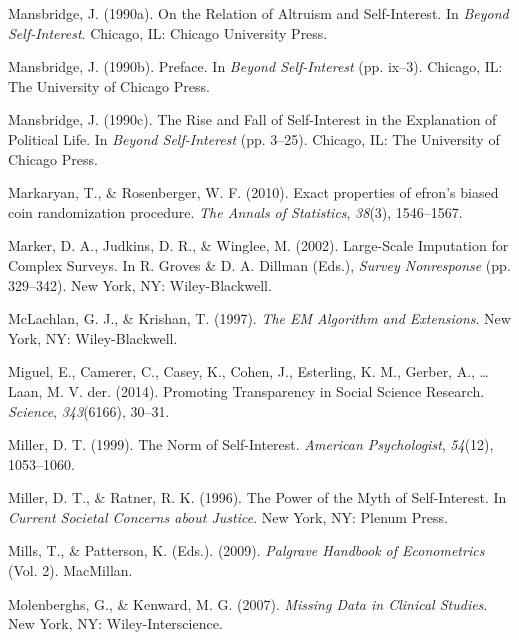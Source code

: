 \documentclass[12pt,econ]{sources/authesis}
\begin{document}
\leavevmode\hypertarget{ref-mansbridge_1990_relation}{}%
Mansbridge, J. (1990a). On the Relation of Altruism and Self-Interest. In \emph{Beyond Self-Interest}. Chicago, IL: Chicago University Press.

\leavevmode\hypertarget{ref-mansbridge_preface_1990}{}%
Mansbridge, J. (1990b). Preface. In \emph{Beyond Self-Interest} (pp. ix--3). Chicago, IL: The University of Chicago Press.

\leavevmode\hypertarget{ref-mansbridge_rise_1990}{}%
Mansbridge, J. (1990c). The Rise and Fall of Self-Interest in the Explanation of Political Life. In \emph{Beyond Self-Interest} (pp. 3--25). Chicago, IL: The University of Chicago Press.

\leavevmode\hypertarget{ref-markaryan_2010_exact}{}%
Markaryan, T., \& Rosenberger, W. F. (2010). Exact properties of efron's biased coin randomization procedure. \emph{The Annals of Statistics}, \emph{38}(3), 1546--1567.

\leavevmode\hypertarget{ref-marker_2002_large-scale}{}%
Marker, D. A., Judkins, D. R., \& Winglee, M. (2002). Large-Scale Imputation for Complex Surveys. In R. Groves \& D. A. Dillman (Eds.), \emph{Survey Nonresponse} (pp. 329--342). New York, NY: Wiley-Blackwell.

\leavevmode\hypertarget{ref-mclachlan_1997_algorithm}{}%
McLachlan, G. J., \& Krishan, T. (1997). \emph{The EM Algorithm and Extensions}. New York, NY: Wiley-Blackwell.

\leavevmode\hypertarget{ref-miguel_2014_promoting}{}%
Miguel, E., Camerer, C., Casey, K., Cohen, J., Esterling, K. M., Gerber, A., \ldots{} Laan, M. V. der. (2014). Promoting Transparency in Social Science Research. \emph{Science}, \emph{343}(6166), 30--31.

\leavevmode\hypertarget{ref-miller_norm_1999}{}%
Miller, D. T. (1999). The Norm of Self-Interest. \emph{American Psychologist}, \emph{54}(12), 1053--1060.

\leavevmode\hypertarget{ref-miller_power_1996}{}%
Miller, D. T., \& Ratner, R. K. (1996). The Power of the Myth of Self-Interest. In \emph{Current Societal Concerns about Justice}. New York, NY: Plenum Press.

\leavevmode\hypertarget{ref-mills_2009_palgrave}{}%
Mills, T., \& Patterson, K. (Eds.). (2009). \emph{Palgrave Handbook of Econometrics} (Vol. 2). MacMillan.

\leavevmode\hypertarget{ref-molenberghs_2007_missing}{}%
Molenberghs, G., \& Kenward, M. G. (2007). \emph{Missing Data in Clinical Studies}. New York, NY: Wiley-Interscience.
\end{document}
